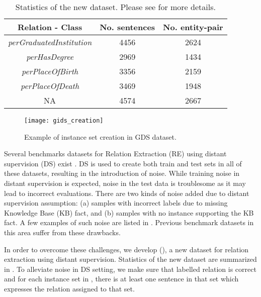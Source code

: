 \documentclass{article}
\begin{document}
\begin{table}[t]
\scriptsize
     \centering
\begin{tabular}{|c|c|c|}
    \hline
    Relation - Class           & No. sentences   & No. entity-pair \\ \hline
    \textit{perGraduatedInstitution}     & 4456 & 2624  \\ \hline
    \textit{perHasDegree} & 2969 & 1434   \\ \hline
    \textit{perPlaceOfBirth}      & 3356        & 2159   \\ \hline
    \textit{perPlaceOfDeath}    & 3469     & 1948 \\ \hline
    NA      & 4574 & 2667 \\ \hline
    \end{tabular}
    \caption{\label{tab:dataset}Statistics of the new  \newdatasetshort{} dataset. Please see  for more details.}
\end{table}

 \begin{figure}[t]
  \centering
  \setlength{\textfloatsep}{0.30cm}
  \texttt{[image: gids\_creation]}
  \caption{\label{fig:gids_creation}Example of instance set creation in GDS dataset.}
\end{figure}



Several benchmarks datasets for Relation Extraction (RE) using distant supervision (DS) exist \cite{riedel:2010,mintz:2009}. DS is used to create both train and test sets in all of these datasets, resulting in the introduction of noise. While training noise in distant supervision is expected, noise in the test data is troublesome as it may lead to incorrect evaluations. There are two kinds of noise added due to distant supervision assumption: (a) samples with incorrect labels due to missing Knowledge Base (KB) fact, and (b) samples with no instance supporting the KB fact. A few examples of such noise are listed in . Previous benchmark datasets in this area suffer from these drawbacks. 

In order to overcome these challenges, we develop \newdataset{} (\newdatasetshort{}), a new dataset for relation extraction using distant supervision. Statistics of the new dataset are summarized in . To alleviate noise in DS setting, we make sure that labelled relation is correct and for each instance set in \newdatasetshort{}, there is at least one sentence in that set which expresses the relation assigned to that set. 
\end{document}
